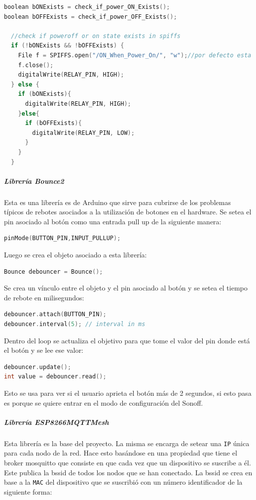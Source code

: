\begin{lstlisting}[language=C]
boolean bONExists = check_if_power_ON_Exists();
boolean bOFFExists = check_if_power_OFF_Exists();

  //check if poweroff or on state exists in spiffs
  if (!bONExists && !bOFFExists) {
    File f = SPIFFS.open("/ON_When_Power_On/", "w");//por defecto esta ON
    f.close();
    digitalWrite(RELAY_PIN, HIGH);
  } else {
    if (bONExists){
      digitalWrite(RELAY_PIN, HIGH);
    }else{
      if (bOFFExists){
        digitalWrite(RELAY_PIN, LOW);
      }
    }
  }
\end{lstlisting}

\subparagraph{Librería Bounce2}
%
Esta es una librería es de Arduino que sirve para cubrirse de los problemas típicos de rebotes asociados a la utilización de botones en el hardware. Se setea el pin asociado al botón como una entrada pull up de la siguiente manera:

\begin{lstlisting}[language=C]
pinMode(BUTTON_PIN,INPUT_PULLUP);
\end{lstlisting}

Luego se crea el objeto asociado a esta librería:

\begin{lstlisting}[language=C]
Bounce debouncer = Bounce();
\end{lstlisting}

Se crea un vínculo entre el objeto y el pin asociado al botón y se setea el tiempo de rebote en milisegundos:

\begin{lstlisting}[language=C]
debouncer.attach(BUTTON_PIN);
debouncer.interval(5); // interval in ms
\end{lstlisting}

Dentro del loop se actualiza el objetivo para que tome el valor del pin donde está el botón y  se lee ese valor:

\begin{lstlisting}[language=C]
debouncer.update();
int value = debouncer.read();
\end{lstlisting}

Esto se usa para ver si el usuario aprieta el botón más de 2 segundos, si esto pasa es porque se quiere entrar en el modo de configuración del Sonoff.

\subparagraph{Librería ESP8266MQTTMesh}
%
Esta librería es la base del proyecto. La misma se encarga de setear una \lstinline[columns=fixed]{IP} única para cada nodo de la red. Hace esto basándose en una propiedad que tiene el broker mosquitto que consiste en que cada vez que un dispositivo se suscribe a él. Este publica la bssid de todos los nodos que se han conectado. La bssid se crea en base a la \lstinline[columns=fixed]{MAC} del dispositivo que se suscribió con un número identificador de la siguiente forma: 


